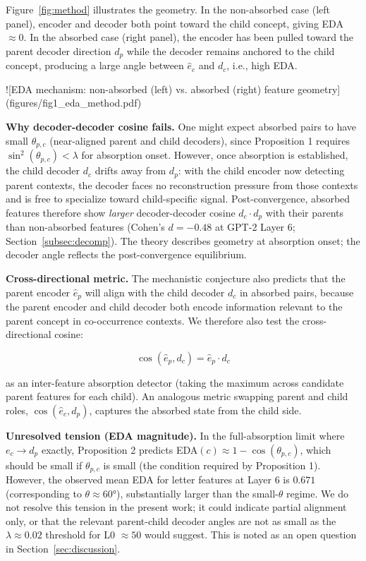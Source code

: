 \documentclass{article}
\begin{document}
Figure~\ref{fig:method} illustrates the geometry. In the non-absorbed case (left panel),
encoder and decoder both point toward the child concept, giving EDA $\approx 0$. In the
absorbed case (right panel), the encoder has been pulled toward the parent decoder direction
$d_p$ while the decoder remains anchored to the child concept, producing a large angle
between $\hat{e}_c$ and $d_c$, i.e., high EDA.

![EDA mechanism: non-absorbed (left) vs. absorbed (right) feature geometry](figures/fig1_eda_method.pdf)

\textbf{Why decoder-decoder cosine fails.} One might expect absorbed pairs to have small
$\theta_{p,c}$ (near-aligned parent and child decoders), since Proposition 1 requires
$\sin^2(\theta_{p,c}) < \lambda$ for absorption onset. However, once absorption is
established, the child decoder $d_c$ drifts away from $d_p$: with the child encoder now
detecting parent contexts, the decoder faces no reconstruction pressure from those contexts
and is free to specialize toward child-specific signal. Post-convergence, absorbed features
therefore show \textit{larger} decoder-decoder cosine $d_c \cdot d_p$ with their parents than
non-absorbed features (Cohen's $d = -0.48$ at GPT-2 Layer 6; Section~\ref{subsec:decomp}).
The theory describes geometry at absorption onset; the decoder angle reflects the
post-convergence equilibrium.

\textbf{Cross-directional metric.} The mechanistic conjecture also predicts that the parent
encoder $\hat{e}_p$ will align with the child decoder $d_c$ in absorbed pairs, because the
parent encoder and child decoder both encode information relevant to the parent concept in
co-occurrence contexts. We therefore also test the cross-directional cosine:

$$\cos(\hat{e}_p, d_c) = \hat{e}_p \cdot d_c$$

as an inter-feature absorption detector (taking the maximum across candidate parent
features for each child). An analogous metric swapping parent and child roles,
$\cos(\hat{e}_c, d_p)$, captures the absorbed state from the child side.

\textbf{Unresolved tension (EDA magnitude).} In the full-absorption limit where $e_c \to d_p$
exactly, Proposition 2 predicts EDA$(c) \approx 1 - \cos(\theta_{p,c})$, which should be
small if $\theta_{p,c}$ is small (the condition required by Proposition 1). However, the
observed mean EDA for letter features at Layer 6 is $0.671$ (corresponding to $\theta
\approx 60°$), substantially larger than the small-$\theta$ regime. We do not resolve this
tension in the present work; it could indicate partial alignment only, or that the relevant
parent-child decoder angles are not as small as the $\lambda \approx 0.02$ threshold
for L0 $\approx 50$ would suggest. This is noted as an open question in
Section~\ref{sec:discussion}.
\end{document}
